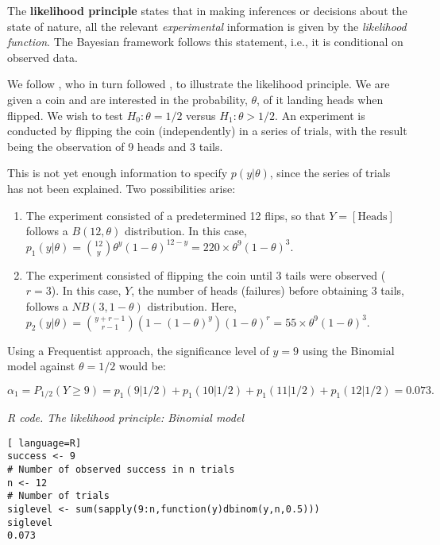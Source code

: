 The \textbf{likelihood principle} states that in making inferences or decisions about the state of nature, all the relevant \textit{experimental} information is given by the \textit{likelihood function}. The Bayesian framework follows this statement, i.e., it is conditional on observed data.

We follow \cite{berger93}, who in turn followed \cite{Lindley76}, to illustrate the likelihood principle. We are given a coin and are interested in the probability, $\theta$, of it landing heads when flipped. We wish to test $H_0: \theta = 1/2$ versus $H_1: \theta > 1/2$. An experiment is conducted by flipping the coin (independently) in a series of trials, with the result being the observation of 9 heads and 3 tails.

This is not yet enough information to specify $p(y|\theta)$, since the series of trials has not been explained. Two possibilities arise:

\begin{enumerate}
	\item The experiment consisted of a predetermined 12 flips, so that $Y = \left[ \text{Heads} \right]$ follows a ${B}(12, \theta)$ distribution. In this case, $p_1(y|\theta) = \binom{12}{y} \theta^y (1 - \theta)^{12 - y} = 220 \times \theta^9 (1 - \theta)^3$.
	\item The experiment consisted of flipping the coin until 3 tails were observed ($r = 3$). In this case, $Y$, the number of heads (failures) before obtaining 3 tails, follows a ${NB}(3, 1 - \theta)$ distribution. Here, $p_2(y|\theta) = \binom{y + r - 1}{r - 1} (1 - (1 - \theta)^y)(1 - \theta)^r = 55 \times \theta^9 (1 - \theta)^3$.
\end{enumerate}

Using a Frequentist approach, the significance level of $y=9$ using the Binomial model against $\theta=1/2$ would be:

\begin{equation*}
	\alpha_1=P_{1/2}(Y\geq
	9)=p_1(9|1/2)+p_1(10|1/2)+p_1(11|1/2)+p_1(12|1/2)=0.073.
\end{equation*}

\begin{tcolorbox}[enhanced,width=4.67in,center upper,
	fontupper=\large\bfseries,drop shadow southwest,sharp corners]
	\textit{R code. The likelihood principle: Binomial model}
\begin{VF}
\begin{lstlisting}[ language=R]
success <- 9 
# Number of observed success in n trials
n <- 12 
# Number of trials
siglevel <- sum(sapply(9:n,function(y)dbinom(y,n,0.5)))
siglevel
0.073
\end{lstlisting}
\end{VF}
\end{tcolorbox}

